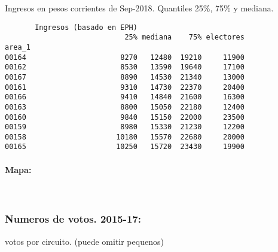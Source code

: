 \documentclass[11pt]{article}
\begin{document}
    
    Ingresos en pesos corrientes de Sep-2018. Quantiles 25\%, 75\% y
mediana.

    
    
    \begin{verbatim}
       Ingresos (basado en EPH)                         
                            25% mediana    75% electores
area_1                                                  
00164                      8270   12480  19210     11900
00162                      8530   13590  19640     17100
00167                      8890   14530  21340     13000
00161                      9310   14730  22370     20400
00166                      9410   14840  21600     16300
00163                      8800   15050  22180     12400
00160                      9840   15150  22000     23500
00159                      8980   15330  21230     12200
00158                     10180   15570  22680     20000
00165                     10250   15720  23430     19900
    \end{verbatim}

    
    \hypertarget{mapa}{%
\paragraph{Mapa:}\label{mapa}}

    
    \begin{center}
    \end{center}
    { \hspace*{\fill} \\}
    
    \hypertarget{numeros-de-votos.-2015-17}{%
\subsubsection{Numeros de votos.
2015-17:}\label{numeros-de-votos.-2015-17}}

    
    votos por circuito. (puede omitir pequenos)

    
    
\end{document}
